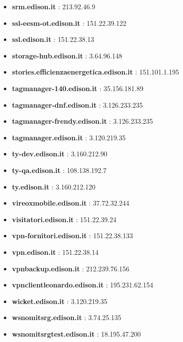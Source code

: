 \documentclass{article}
\begin{document}
\begin{itemize}
        \item \textbf{ srm.edison.it }: 213.92.46.9
    
        \item \textbf{ ssl-eesm-ot.edison.it }: 151.22.39.122
    
        \item \textbf{ ssl.edison.it }: 151.22.38.13
    
        \item \textbf{ storage-hub.edison.it }: 3.64.96.148
    
        \item \textbf{ stories.efficienzaenergetica.edison.it }: 151.101.1.195
    
        \item \textbf{ tagmanager-140.edison.it }: 35.156.181.89
    
        \item \textbf{ tagmanager-dnf.edison.it }: 3.126.233.235
    
        \item \textbf{ tagmanager-frendy.edison.it }: 3.126.233.235
    
        \item \textbf{ tagmanager.edison.it }: 3.120.219.35
    
        \item \textbf{ ty-dev.edison.it }: 3.160.212.90
    
        \item \textbf{ ty-qa.edison.it }: 108.138.192.7
    
        \item \textbf{ ty.edison.it }: 3.160.212.120
    
        \item \textbf{ vireoxmobile.edison.it }: 37.72.32.244
    
        \item \textbf{ visitatori.edison.it }: 151.22.39.24
    
        \item \textbf{ vpn-fornitori.edison.it }: 151.22.38.133
    
        \item \textbf{ vpn.edison.it }: 151.22.38.14
    
        \item \textbf{ vpnbackup.edison.it }: 212.239.76.156
    
        \item \textbf{ vpnclientleonardo.edison.it }: 195.231.62.154
    
        \item \textbf{ wicket.edison.it }: 3.120.219.35
    
        \item \textbf{ wsnomitsrg.edison.it }: 3.74.25.135
    
        \item \textbf{ wsnomitsrgtest.edison.it }: 18.195.47.200
    
\end{itemize}
\end{document}
